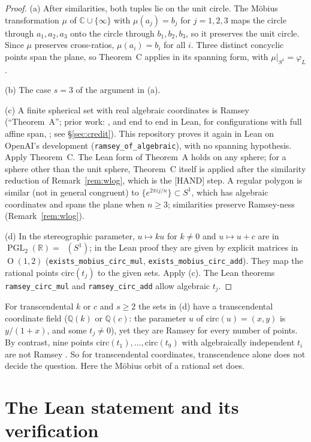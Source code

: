 \documentclass[11pt]{amsart}
\newcommand{\st}[1]{\textsf{[#1]}}
\newcommand{\Q}{\mathbb{Q}}
\newcommand{\R}{\mathbb{R}}
\newcommand{\C}{\mathbb{C}}
\DeclareMathOperator{\Ort}{O}
\DeclareMathOperator{\PGL}{PGL}
\DeclareMathOperator{\Mob}{M\ddot{o}b}
\newcommand{\circmap}{\mathrm{circ}}
\theoremstyle{plain}
\theoremstyle{definition}
\begin{document}
\begin{proof}
(a) After similarities, both tuples lie on the unit circle. The M\"obius transformation $\mu$ of
$\C\cup\{\infty\}$ with $\mu(a_j)=b_j$ for $j=1,2,3$ maps the circle through $a_1,a_2,a_3$ onto
the circle through $b_1,b_2,b_3$, so it preserves the unit circle. Since $\mu$ preserves
cross-ratios, $\mu(a_i)=b_i$ for all $i$. Three distinct concyclic points span the plane, so
Theorem~C applies in its spanning form, with $\mu|_{S^1}=\varphi_L$.

(b) The case $s=3$ of the argument in (a).

(c) A finite spherical set with real algebraic coordinates is Ramsey (``Theorem~A''; prior work:
\cite{JDJones,Rogerhu}, and end to end in Lean, for configurations with full affine span,
\cite{Atimics}; see \S\ref{sec:credit}). This repository proves it again in Lean on OpenAI's
development (\texttt{ramsey\_of\_algebraic}), with no spanning hypothesis. Apply Theorem~C. The
Lean form of Theorem~A holds on any sphere; for a sphere other than the unit sphere, Theorem~C
itself is applied after the similarity reduction of Remark~\ref{rem:wlog}, which is the
\st{HAND} step. A regular polygon is similar (not in general
congruent) to $\{e^{2\pi i j/n}\}\subset S^1$, which has algebraic coordinates and spans the plane
when $n\ge3$; similarities preserve Ramsey-ness (Remark~\ref{rem:wlog}).

(d) In the stereographic parameter, $u\mapsto ku$ for $k\neq0$ and $u\mapsto u+c$ are in
$\PGL_2(\R)=\Mob(S^1)$; in the Lean proof they are given by explicit matrices in $\Ort(1,2)$
(\texttt{exists\_mobius\_circ\_mul}, \texttt{exists\_mobius\_circ\_add}). They map the rational
points $\circmap(t_j)$ to the given sets. Apply (c). The Lean theorems \texttt{ramsey\_circ\_mul}
and \texttt{ramsey\_circ\_add} allow algebraic $t_j$.
\end{proof}

For transcendental $k$ or $c$ and $s\ge2$ the sets in (d) have a transcendental coordinate field
($\Q(k)$ or $\Q(c)$: the parameter $u$ of $\circmap(u)=(x,y)$ is $y/(1+x)$, and some $t_j\ne0$),
yet they are Ramsey for every number of points. By contrast, nine points
$\circmap(t_1),\dots,\circmap(t_9)$ with algebraically independent $t_i$ are not Ramsey
\cite[Prop.~7.6]{OAI172}. So for transcendental coordinates, transcendence alone does not decide
the question. Here the M\"obius orbit of a
rational set does.

\section{The Lean statement and its verification}\label{sec:lean}
\end{document}
